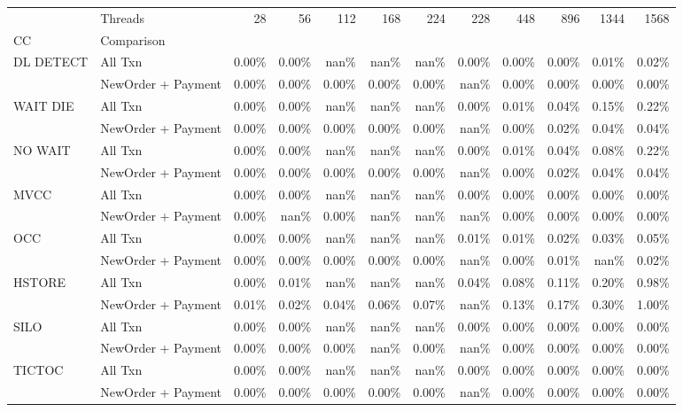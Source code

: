 \begin{tabular}{llrrrrrrrrrr}
\toprule
       & Threads &  28   &  56   &  112  &  168  &  224  &  228  &  448  &  896  &  1344 &  1568 \\
CC & Comparison &       &       &       &       &       &       &       &       &       &       \\
\midrule
DL DETECT & All Txn & 0.00\% & 0.00\% &  nan\% &  nan\% &  nan\% & 0.00\% & 0.00\% & 0.00\% & 0.01\% & 0.02\% \\
       & NewOrder + Payment & 0.00\% & 0.00\% & 0.00\% & 0.00\% & 0.00\% &  nan\% & 0.00\% & 0.00\% & 0.00\% & 0.00\% \\
WAIT DIE & All Txn & 0.00\% & 0.00\% &  nan\% &  nan\% &  nan\% & 0.00\% & 0.01\% & 0.04\% & 0.15\% & 0.22\% \\
       & NewOrder + Payment & 0.00\% & 0.00\% & 0.00\% & 0.00\% & 0.00\% &  nan\% & 0.00\% & 0.02\% & 0.04\% & 0.04\% \\
NO WAIT & All Txn & 0.00\% & 0.00\% &  nan\% &  nan\% &  nan\% & 0.00\% & 0.01\% & 0.04\% & 0.08\% & 0.22\% \\
       & NewOrder + Payment & 0.00\% & 0.00\% & 0.00\% & 0.00\% & 0.00\% &  nan\% & 0.00\% & 0.02\% & 0.04\% & 0.04\% \\
MVCC & All Txn & 0.00\% & 0.00\% &  nan\% &  nan\% &  nan\% & 0.00\% & 0.00\% & 0.00\% & 0.00\% & 0.00\% \\
       & NewOrder + Payment & 0.00\% &  nan\% & 0.00\% &  nan\% &  nan\% &  nan\% & 0.00\% & 0.00\% & 0.00\% & 0.00\% \\
OCC & All Txn & 0.00\% & 0.00\% &  nan\% &  nan\% &  nan\% & 0.01\% & 0.01\% & 0.02\% & 0.03\% & 0.05\% \\
       & NewOrder + Payment & 0.00\% & 0.00\% & 0.00\% & 0.00\% & 0.00\% &  nan\% & 0.00\% & 0.01\% &  nan\% & 0.02\% \\
HSTORE & All Txn & 0.00\% & 0.01\% &  nan\% &  nan\% &  nan\% & 0.04\% & 0.08\% & 0.11\% & 0.20\% & 0.98\% \\
       & NewOrder + Payment & 0.01\% & 0.02\% & 0.04\% & 0.06\% & 0.07\% &  nan\% & 0.13\% & 0.17\% & 0.30\% & 1.00\% \\
SILO & All Txn & 0.00\% & 0.00\% &  nan\% &  nan\% &  nan\% & 0.00\% & 0.00\% & 0.00\% & 0.00\% & 0.00\% \\
       & NewOrder + Payment & 0.00\% & 0.00\% & 0.00\% &  nan\% & 0.00\% &  nan\% & 0.00\% & 0.00\% & 0.00\% & 0.00\% \\
TICTOC & All Txn & 0.00\% & 0.00\% &  nan\% &  nan\% &  nan\% & 0.00\% & 0.00\% & 0.00\% & 0.00\% & 0.00\% \\
       & NewOrder + Payment & 0.00\% & 0.00\% & 0.00\% & 0.00\% & 0.00\% &  nan\% & 0.00\% & 0.00\% & 0.00\% & 0.00\% \\
\bottomrule
\end{tabular}

